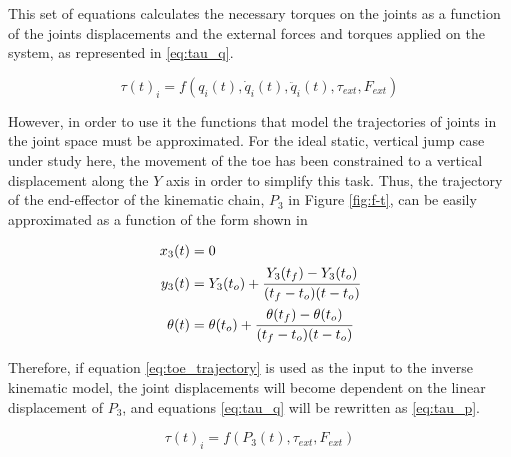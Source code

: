 This set of equations calculates the necessary torques on the joints as a function of the joints displacements and the external forces and torques applied on the system, as represented in \ref{eq:tau_q}.

\begin{equation}
\label{eq:tau_q}
	\tau(t)_{i} = f(q_{i}(t), \dot{q}_{i}(t), \ddot{q}_{i}(t), \tau_{ext}, F_{ext})
\end{equation}

However, in order to use it the functions that model the trajectories of joints in the joint space must be approximated.
For the ideal static, vertical jump case under study here, the movement of the toe has been constrained to a vertical displacement along the $Y$ axis in order to simplify this task.
Thus, the trajectory of the end-effector of the kinematic chain, $P_{3}$ in Figure \ref{fig:f-t}, can be easily approximated as a function of the form shown in 

\begin{equation}
\label{eq:toe_trajectory}
	\begin{aligned}
	x_{3}(t) &= 0 \\
	y_{3}(t) &= Y_{3}(t_{o}) + \cfrac{Y_{3}(t_{f}) - Y_{3}(t_{o})}{(t_{f} - t_{o}) (t - t_{o})} \\
    \theta(t) &= \theta(t_{o}) + \cfrac{\theta(t_{f}) - \theta(t_{o})}{(t_{f} - t_{o}) (t - t_{o})} 
    \end{aligned}
\end{equation}

Therefore, if equation \ref{eq:toe_trajectory} is used as the input to the inverse kinematic model, the joint displacements will become dependent on the linear displacement of $P_{3}$, and equations \ref{eq:tau_q} will be rewritten as \ref{eq:tau_p}.

\begin{equation}
\label{eq:tau_p}
	\tau(t)_{i} = f(P_{3}(t), \tau_{ext}, F_{ext})
\end{equation}





